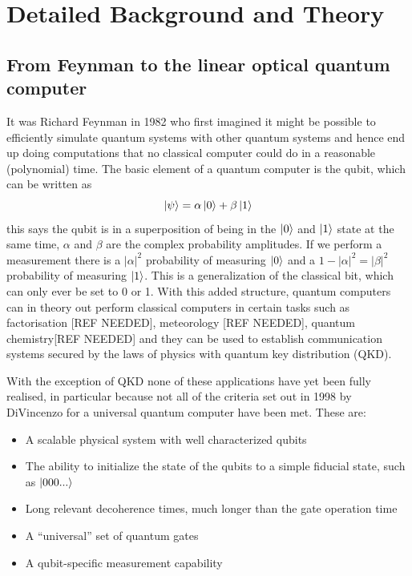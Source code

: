 \newpage
\section{Detailed Background and Theory}
\subsection{From Feynman to the linear optical quantum computer}
It was Richard Feynman in 1982\cite{feynman_simulating_1982} who first imagined it might be possible to efficiently simulate quantum systems with other quantum systems and hence end up doing computations that no classical computer could do in a reasonable (polynomial) time. The basic element of a quantum computer is the qubit, which can be written as
\begin{equation}
\ket{\psi}=\alpha \ket{0}+\beta\ket{1}
\end{equation}
this says the qubit is in a superposition of being in the $\ket{0}$ and $\ket{1}$ state at the same time, $\alpha$ and $\beta$ are the complex probability amplitudes. If we perform a measurement there is a $|\alpha|^2$ probability of measuring $\ket{0}$ and a $1-|\alpha|^2=|\beta|^2$ probability of measuring $\ket{1}$. This is a generalization of the classical bit, which can only ever be set to 0 or 1. With this added structure, quantum computers can in theory out perform classical computers in certain tasks such as factorisation [REF NEEDED], meteorology [REF NEEDED], quantum chemistry[REF NEEDED] and they can be used to establish communication systems secured by the laws of physics with quantum key distribution (QKD).

With the exception of QKD none of these applications have yet been fully realised, in particular because not all of the criteria  \cite{divincenzo_quantum_1998} set out in 1998 by DiVincenzo for a universal quantum  computer have been met. These are:
\begin{itemize}
	\item A scalable physical system with well characterized
qubits
	\item The ability to initialize the state of the qubits to a
simple fiducial state, such as $\ket{000...}$
	\item Long relevant decoherence times, much longer than
the gate operation time
	\item A “universal” set of quantum gates
	\item A qubit-specific measurement capability
\end{itemize}

